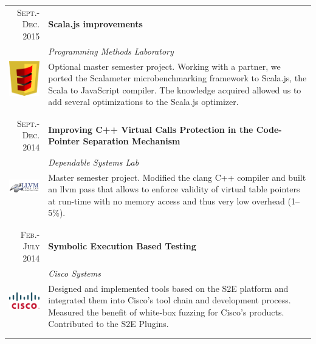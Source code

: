 \documentclass[a4paper,11pt]{article} %
\begin{document}
\begin{tabularx}{\textwidth}{r|X}

\textsc{Sept.-Dec. 2015} & \textbf{Scala.js improvements} \\
\multirow{4}{*}{ \includegraphics[width=40pt]{img/scala-js.eps}}
& \emph{Programming Methods Laboratory}\\ 
& \footnotesize{Optional master semester project. Working with a partner, 
we ported the Scalameter microbenchmarking framework to Scala.js, the Scala 
to JavaScript compiler. The knowledge acquired allowed us to
add several optimizations to the Scala.js optimizer.}\\
\multicolumn{2}{c}{} \\
\\


\textsc{Sept.-Dec. 2014} & \textbf{Improving C++ Virtual Calls Protection in the Code-Pointer Separation Mechanism} \\
\multirow{2}{*}{ \includegraphics[width=60pt]{img/llvm.eps}}
& \emph{Dependable Systems Lab}\\ 
& \footnotesize{Master semester project. Modified the clang C++ compiler and
built an llvm pass that allows to enforce validity of virtual table pointers at
run-time with no memory access and thus very low overhead (1--5\%).}\\
\multicolumn{2}{c}{} \\
\\


\textsc{Feb.-July 2014} & \textbf{Symbolic Execution Based Testing} \\
\multirow{4}{*}{ \includegraphics[width=60pt]{img/cisco.eps}}
& \emph{Cisco Systems}\\ 
& \footnotesize{Designed and implemented tools based on the S2E platform and
integrated them into Cisco's tool chain and development process. Measured the
benefit of white-box fuzzing for Cisco's products. Contributed to the S2E
Plugins.}\\
\multicolumn{2}{c}{} \\
\\


\end{tabularx}
\end{document}
